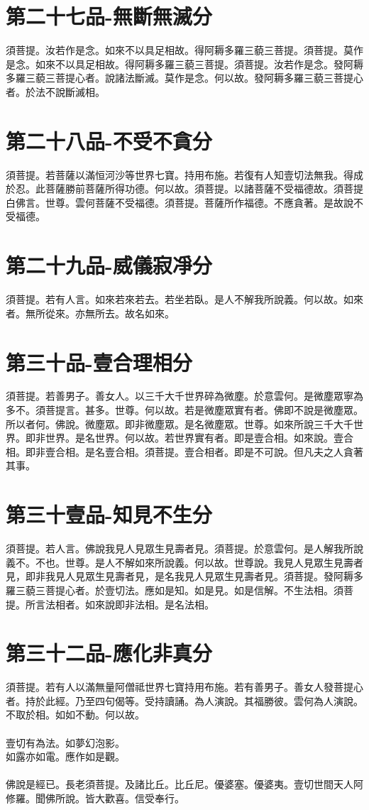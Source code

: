 \documentclass[a6paper, 22pt, twocolumn]{cvertbook}
\begin{document}
\chapter{第二十七品-無斷無滅分}
\large 須菩提。汝若作是念。如來不以具足相故。得阿耨多羅三藐三菩提。須菩提。莫作是念。如來不以具足相故。得阿耨多羅三藐三菩提。須菩提。汝若作是念。發阿耨多羅三藐三菩提心者。說諸法斷滅。莫作是念。何以故。發阿耨多羅三藐三菩提心者。於法不說斷滅相。
\chapter{第二十八品-不受不貪分}
\large 須菩提。若菩薩以滿恒河沙等世界七寶。持用布施。若復有人知壹切法無我。得成於忍。此菩薩勝前菩薩所得功德。何以故。須菩提。以諸菩薩不受福德故。須菩提白佛言。世尊。雲何菩薩不受福德。須菩提。菩薩所作福德。不應貪著。是故說不受福德。
\chapter{第二十九品-威儀寂凈分}
\large 須菩提。若有人言。如來若來若去。若坐若臥。是人不解我所說義。何以故。如來者。無所從來。亦無所去。故名如來。
\chapter{第三十品-壹合理相分}
\large 須菩提。若善男子。善女人。以三千大千世界碎為微塵。於意雲何。是微塵眾寧為多不。須菩提言。甚多。世尊。何以故。若是微塵眾實有者。佛即不說是微塵眾。所以者何。佛說。微塵眾。即非微塵眾。是名微塵眾。世尊。如來所說三千大千世界。即非世界。是名世界。何以故。若世界實有者。即是壹合相。如來說。壹合相。即非壹合相。是名壹合相。須菩提。壹合相者。即是不可說。但凡夫之人貪著其事。

\chapter{第三十壹品-知見不生分}
\large 須菩提。若人言。佛說我見人見眾生見壽者見。須菩提。於意雲何。是人解我所說義不。不也。世尊。是人不解如來所說義。何以故。世尊說。我見人見眾生見壽者見，即非我見人見眾生見壽者見，是名我見人見眾生見壽者見。須菩提。發阿耨多羅三藐三菩提心者。於壹切法。應如是知。如是見。如是信解。不生法相。須菩提。所言法相者。如來說即非法相。是名法相。
\chapter{第三十二品-應化非真分}
\large 須菩提。若有人以滿無量阿僧祗世界七寶持用布施。若有善男子。善女人發菩提心者。持於此經。乃至四句偈等。受持讀誦。為人演說。其福勝彼。雲何為人演說。不取於相。如如不動。何以故。\\\\壹切有為法。如夢幻泡影。\\如露亦如電。應作如是觀。\\\\佛說是經已。長老須菩提。及諸比丘。比丘尼。優婆塞。優婆夷。壹切世間天人阿修羅。聞佛所說。皆大歡喜。信受奉行。
\end{document}
